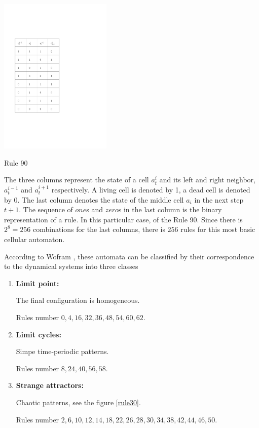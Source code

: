 \begin{table}[htbp]
 \centering
 \includegraphics[width=0.4\textwidth]{./img/1Drule}
 \caption{Rule 90}
 \label{rule90}
\end{table}


The three columns represent the state of a cell $a_t^i$ and its left and right neighbor, $a_t^{i-1}$ and $a_t^{i+1}$ respectively. A living cell is denoted by 1, a dead cell is denoted by 0. The last column denotes the state of the middle cell $a_i$ in the next step $t+1$. The sequence of $one$s and $zero$s in the last column is the binary representation of a rule. In this particular case, of the Rule 90.
Since there is $2^8=256$ combinations for the last columns, there is $256$ rules for this most basic cellular automaton.

According to Wofram \cite{wolf}, these automata can be classified by their correspondence to the dynamical systems into three classes \cite{wolf}
\begin{enumerate}
\item \textbf{Limit point:}

The final configuration is homogeneous. 

Rules number $0,4,16,32,36,48,54,60,62$.

\item \textbf{Limit cycles:}

Simpe time-periodic patterns. 

Rules number $8,24,40,56,58$.

\item \textbf{Strange attractors:}

Chaotic patterns, see the figure \ref{rule30}. 

Rules number $2,6,10,12,14,18,22,26,28,30,34,38,42,44,46,50$.

%
%
%
\end{enumerate}


